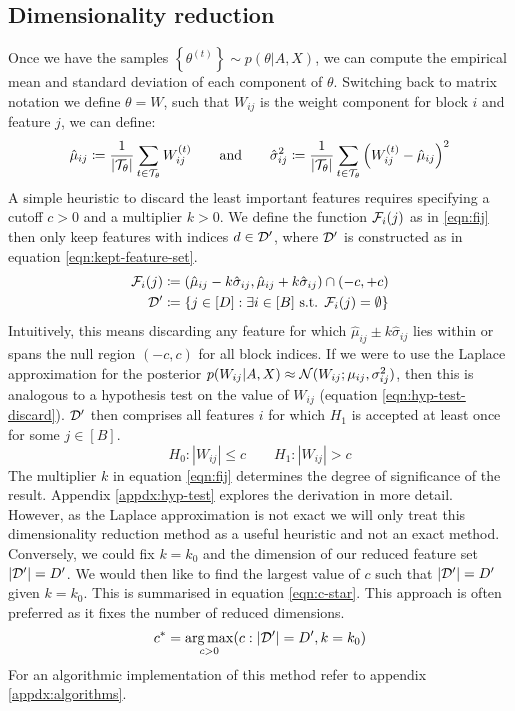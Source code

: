 \subsection{Dimensionality reduction}
\label{sec:dim-reduction}

Once we have the samples $\left\{ \theta^{(t)} \right\} \sim p(\theta | A, X)$, we can compute the empirical mean and standard deviation of each component of $\theta$. Switching back to matrix notation we define $\theta = W$, such that $W_{ij}$ is the weight component for block $i$ and feature $j$, we can define:
%
\begin{equation}
	\hat{\mu}_{ij} \coloneqq \frac{1}{|\mathcal{T}_\theta|} \sum_{t \in \mathcal{T}_\theta} W_{ij}^{(t)} \qquad \textrm{and} \qquad
	\hat{\sigma}_{ij}^2 \coloneqq \frac{1}{|\mathcal{T}_\theta|} \sum_{t \in \mathcal{T}_\theta} \left( W_{ij}^{(t)} - \hat{\mu}_{ij} \right)^2
\end{equation}
%
A simple heuristic to discard the least important features requires specifying a cutoff $c > 0$ and a multiplier $k > 0$. We define the function $\mathcal{F}_i(j)$ as in \ref{eqn:fij} then only keep features with indices $d \in \mathcal{D}'$, where $\mathcal{D}'$ is constructed as in equation \ref{eqn:kept-feature-set}.
%
\begin{align}
	\mathcal{F}_i(j) &\coloneqq (\hat{\mu}_{ij} - k \hat{\sigma}_{ij}, \hat{\mu}_{ij} + k \hat{\sigma}_{ij}) \cap (-c, +c)
	\label{eqn:fij} \\
	\mathcal{D}' &\coloneqq \left\{ j \in [D] : \exists i \in [B] \textrm{ s.t. }  \mathcal{F}_i(j) = \emptyset \right\}
	\label{eqn:kept-feature-set}
\end{align}
%
Intuitively, this means discarding any feature for which $\hat{\mu}_{ij} \pm k\hat{\sigma}_{ij}$ lies within or spans the null region $(-c, c)$ for all block indices. If we were to use the Laplace approximation for the posterior $p(W_{ij} | A, X) \approx \mathcal{N}(W_{ij}; \mu_{ij}, \sigma_{ij}^2)$, then this is analogous to a hypothesis test on the value of $W_{ij}$ (equation \ref{eqn:hyp-test-discard}). $\mathcal{D}'$ then comprises all features $i$ for which $H_1$ is accepted at least once for some $j \in [B]$.
%
\begin{equation}
	H_0: |W_{ij}| \leq c \qquad
	H_1: |W_{ij}| > c
	\label{eqn:hyp-test-discard}
\end{equation}
%
The multiplier $k$ in equation \ref{eqn:fij} determines the degree of significance of the result. Appendix \ref{appdx:hyp-test} explores the derivation in more detail. However, as the Laplace approximation is not exact we will only treat this dimensionality reduction method as a useful heuristic and not an exact method. Conversely, we could fix $k=k_0$ and the dimension of our reduced feature set $|\mathcal{D}'|=D'$. We would then like to find the largest value of $c$ such that $|\mathcal{D}'|=D'$ given $k=k_0$. This is summarised in equation \ref{eqn:c-star}. This approach is often preferred as it fixes the number of reduced dimensions.
%
\begin{equation}
	c^* = \operatorname*{arg\,max}_{c>0} (c : |\mathcal{D}'| = D', k=k_0)
	\label{eqn:c-star}
\end{equation}
%
For an algorithmic implementation of this method refer to appendix \ref{appdx:algorithms}.